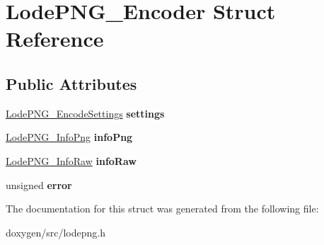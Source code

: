 \hypertarget{struct_lode_p_n_g___encoder}{}\section{Lode\+P\+N\+G\+\_\+\+Encoder Struct Reference}
\label{struct_lode_p_n_g___encoder}
\subsection*{Public Attributes}
\begin{DoxyCompactItemize}
\item 
\mbox{\label{struct_lode_p_n_g___encoder_ae36ceb21b9d1007491f4edbb2be12bab}} 
\mbox{\hyperlink{struct_lode_p_n_g___encode_settings}{Lode\+P\+N\+G\+\_\+\+Encode\+Settings}} {\bfseries settings}
\item 
\mbox{\label{struct_lode_p_n_g___encoder_a5c4bc6d9be898fbcc14b5d762d69457e}} 
\mbox{\hyperlink{struct_lode_p_n_g___info_png}{Lode\+P\+N\+G\+\_\+\+Info\+Png}} {\bfseries info\+Png}
\item 
\mbox{\label{struct_lode_p_n_g___encoder_af37ca9b0bcecd5d1d68756fd293ab998}} 
\mbox{\hyperlink{struct_lode_p_n_g___info_raw}{Lode\+P\+N\+G\+\_\+\+Info\+Raw}} {\bfseries info\+Raw}
\item 
\mbox{\label{struct_lode_p_n_g___encoder_a18e658a08db22dd34fc26c138f3eb2df}} 
unsigned {\bfseries error}
\end{DoxyCompactItemize}


The documentation for this struct was generated from the following file\+:\begin{DoxyCompactItemize}
\item 
doxygen/src/lodepng.\+h\end{DoxyCompactItemize}
